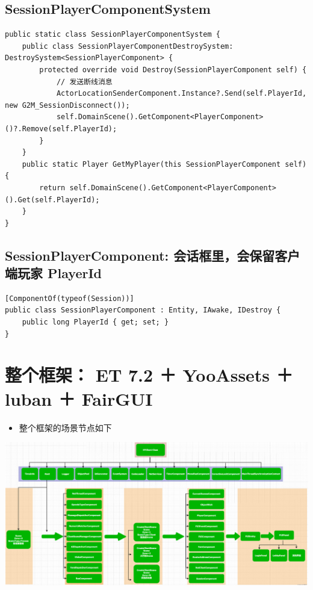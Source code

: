 \documentclass[9pt, b5paper]{article}
\begin{document}
\subsection{SessionPlayerComponentSystem}
\label{sec-9-6}
\begin{verbatim}
public static class SessionPlayerComponentSystem {
    public class SessionPlayerComponentDestroySystem: DestroySystem<SessionPlayerComponent> {
        protected override void Destroy(SessionPlayerComponent self) {
            // 发送断线消息
            ActorLocationSenderComponent.Instance?.Send(self.PlayerId, new G2M_SessionDisconnect());
            self.DomainScene().GetComponent<PlayerComponent>()?.Remove(self.PlayerId);
        }
    }
    public static Player GetMyPlayer(this SessionPlayerComponent self) {
        return self.DomainScene().GetComponent<PlayerComponent>().Get(self.PlayerId);
    }
}
\end{verbatim}

\subsection{SessionPlayerComponent: 会话框里，会保留客户端玩家 PlayerId}
\label{sec-9-7}
\begin{verbatim}
[ComponentOf(typeof(Session))]
public class SessionPlayerComponent : Entity, IAwake, IDestroy {
    public long PlayerId { get; set; }
}
\end{verbatim}
\section{}
\label{sec-10}
\subsection{}
\label{sec-10-1}
\subsection{}
\label{sec-10-2}
\section{整个框架： ET 7.2 ＋ YooAssets ＋ luban ＋ FairGUI}
\label{sec-11}
\begin{itemize}
\item 整个框架的场景节点如下
\end{itemize}

\includegraphics[width=.9\linewidth]{./pic/ET_20230512_143227.png}
\end{document}
